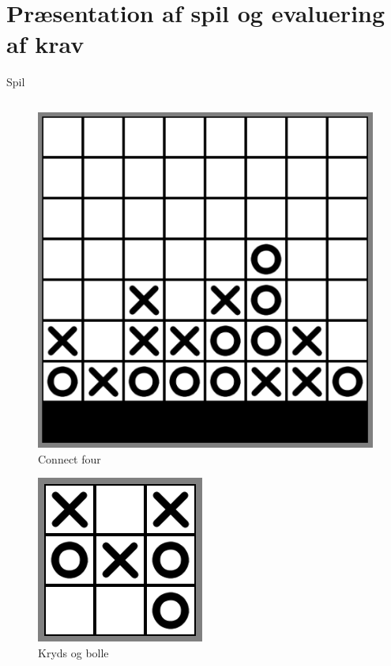 \section{Præsentation af spil og evaluering af krav}

\begin{frame}{Spil}
\begin{columns}
	\begin{column}{.49\textwidth}
	\centering
		\begin{figure}[H]
   			\includegraphics[scale=0.18]{billeder/connect4.png}
   			\caption{Connect four}
		\end{figure}
	\hspace{0.3cm}
	\centering
		\begin{figure}[H]
   			\includegraphics[scale=0.28]{billeder/noughtncrosses.png}
   			\caption{Kryds og bolle}
		\end{figure}

\end{column}
\end{columns}
\end{frame}
